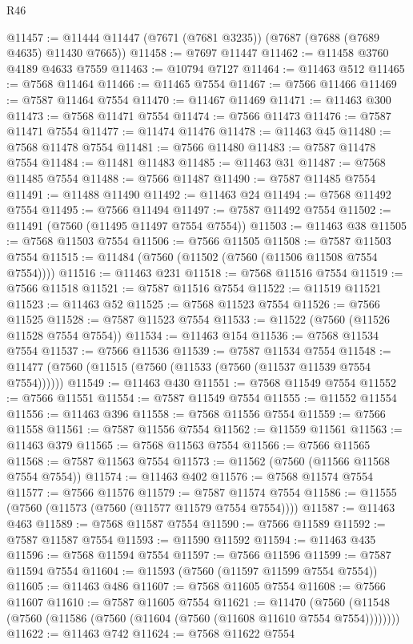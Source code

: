 \begin{lexlean}{R46}
\begin{coremodule}
@11457 := @11444 @11447 (@7671 (@7681 @3235)) (@7687 (@7688 (@7689 @4635) @11430 @7665))
@11458 := @7697 @11447
@11462 := @11458 @3760 @4189 @4633 @7559
@11463 := @10794 @7127
@11464 := @11463 @512
@11465 := @7568 @11464
@11466 := @11465 @7554
@11467 := @7566 @11466
@11469 := @7587 @11464 @7554
@11470 := @11467 @11469
@11471 := @11463 @300
@11473 := @7568 @11471 @7554
@11474 := @7566 @11473
@11476 := @7587 @11471 @7554
@11477 := @11474 @11476
@11478 := @11463 @45
@11480 := @7568 @11478 @7554
@11481 := @7566 @11480
@11483 := @7587 @11478 @7554
@11484 := @11481 @11483
@11485 := @11463 @31
@11487 := @7568 @11485 @7554
@11488 := @7566 @11487
@11490 := @7587 @11485 @7554
@11491 := @11488 @11490
@11492 := @11463 @24
@11494 := @7568 @11492 @7554
@11495 := @7566 @11494
@11497 := @7587 @11492 @7554
@11502 := @11491 (@7560 (@11495 @11497 @7554 @7554))
@11503 := @11463 @38
@11505 := @7568 @11503 @7554
@11506 := @7566 @11505
@11508 := @7587 @11503 @7554
@11515 := @11484 (@7560 (@11502 (@7560 (@11506 @11508 @7554 @7554))))
@11516 := @11463 @231
@11518 := @7568 @11516 @7554
@11519 := @7566 @11518
@11521 := @7587 @11516 @7554
@11522 := @11519 @11521
@11523 := @11463 @52
@11525 := @7568 @11523 @7554
@11526 := @7566 @11525
@11528 := @7587 @11523 @7554
@11533 := @11522 (@7560 (@11526 @11528 @7554 @7554))
@11534 := @11463 @154
@11536 := @7568 @11534 @7554
@11537 := @7566 @11536
@11539 := @7587 @11534 @7554
@11548 := @11477 (@7560 (@11515 (@7560 (@11533 (@7560 (@11537 @11539 @7554 @7554))))))
@11549 := @11463 @430
@11551 := @7568 @11549 @7554
@11552 := @7566 @11551
@11554 := @7587 @11549 @7554
@11555 := @11552 @11554
@11556 := @11463 @396
@11558 := @7568 @11556 @7554
@11559 := @7566 @11558
@11561 := @7587 @11556 @7554
@11562 := @11559 @11561
@11563 := @11463 @379
@11565 := @7568 @11563 @7554
@11566 := @7566 @11565
@11568 := @7587 @11563 @7554
@11573 := @11562 (@7560 (@11566 @11568 @7554 @7554))
@11574 := @11463 @402
@11576 := @7568 @11574 @7554
@11577 := @7566 @11576
@11579 := @7587 @11574 @7554
@11586 := @11555 (@7560 (@11573 (@7560 (@11577 @11579 @7554 @7554))))
@11587 := @11463 @463
@11589 := @7568 @11587 @7554
@11590 := @7566 @11589
@11592 := @7587 @11587 @7554
@11593 := @11590 @11592
@11594 := @11463 @435
@11596 := @7568 @11594 @7554
@11597 := @7566 @11596
@11599 := @7587 @11594 @7554
@11604 := @11593 (@7560 (@11597 @11599 @7554 @7554))
@11605 := @11463 @486
@11607 := @7568 @11605 @7554
@11608 := @7566 @11607
@11610 := @7587 @11605 @7554
@11621 := @11470
    (@7560 (@11548 (@7560 (@11586 (@7560 (@11604 (@7560 (@11608 @11610 @7554 @7554))))))))
@11622 := @11463 @742
@11624 := @7568 @11622 @7554

\end{coremodule}
\end{lexlean}
